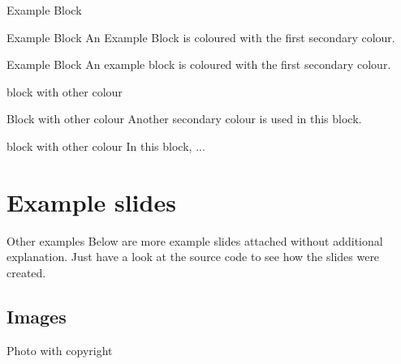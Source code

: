 \documentclass[xcolor={svgnames},12pt,aspectratio=169,handout]{beamer}
\begin{document}
\begin{frame}[fragile]{Example Block}
    \begin{exampleblock}{Example Block}
        An Example Block is coloured with the first secondary colour.
    \end{exampleblock}

    \begin{exampleblock}{Example Block}
    An example block is coloured with the first secondary colour.
    \end{exampleblock}
\end{frame}

\begin{frame}[fragile]{block with other colour}
    \begingroup
        \begin{block}{Block with other colour}
            Another secondary colour is used in this block.
        \end{block}
    \endgroup

    \begingroup
        \begin{block}{block with other colour}
            In this block, ...
        \end{block}
    \endgroup
\end{frame}

\section{Example slides}

\begin{frame}{Other examples}
    Below are more example slides attached without additional explanation.
    Just have a look at the source code to see how the slides were created.
\end{frame}

\subsection{Images}

\begin{frame}{Photo with copyright}
    \begin{figure}
        \centering
    \end{figure}
\end{frame}
\end{document}
